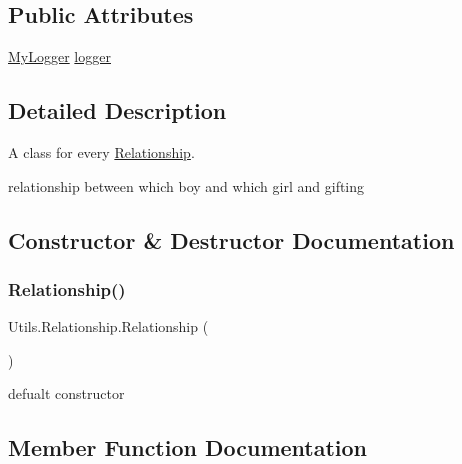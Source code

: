 \subsection*{Public Attributes}
\begin{DoxyCompactItemize}
\item 
\hyperlink{class_utils_1_1_my_logger}{My\+Logger} \hyperlink{class_utils_1_1_relationship_a9035f9009d2786c52785a1a1f230e8ae}{logger}
\end{DoxyCompactItemize}


\subsection{Detailed Description}
A class for every \hyperlink{class_utils_1_1_relationship}{Relationship}. 

relationship between which boy and which girl and gifting 

\subsection{Constructor \& Destructor Documentation}
\mbox{\label{class_utils_1_1_relationship_aadc515fc831621baa2451dd5ddcb82f4}} 
\subsubsection{\texorpdfstring{Relationship()}{Relationship()}}
{\footnotesize\ttfamily Utils.\+Relationship.\+Relationship (\begin{DoxyParamCaption}{ }\end{DoxyParamCaption})\hspace{0.3cm}{\ttfamily [inline]}}

defualt constructor 

\subsection{Member Function Documentation}
\mbox{\label{class_utils_1_1_relationship_a9e66175fde115be45de08f02508b0006}} 
